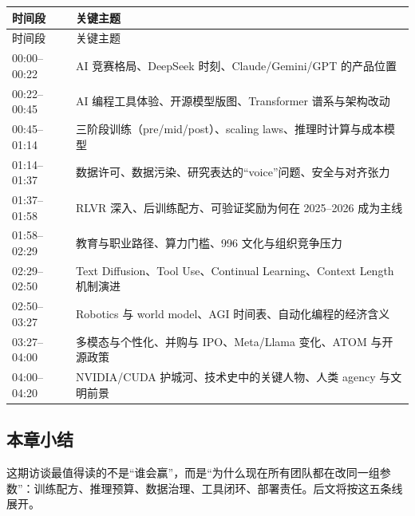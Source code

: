\begin{longtable}{p{}p{}}
\toprule
时间段 & 关键主题 \\
\midrule
\endfirsthead
\toprule
时间段 & 关键主题 \\
\midrule
\endhead
00:00--00:22 & AI 竞赛格局、DeepSeek 时刻、Claude/Gemini/GPT 的产品位置 \\
00:22--00:45 & AI 编程工具体验、开源模型版图、Transformer 谱系与架构改动 \\
00:45--01:14 & 三阶段训练（pre/mid/post）、scaling laws、推理时计算与成本模型 \\
01:14--01:37 & 数据许可、数据污染、研究表达的“voice”问题、安全与对齐张力 \\
01:37--01:58 & RLVR 深入、后训练配方、可验证奖励为何在 2025--2026 成为主线 \\
01:58--02:29 & 教育与职业路径、算力门槛、996 文化与组织竞争压力 \\
02:29--02:50 & Text Diffusion、Tool Use、Continual Learning、Context Length 机制演进 \\
02:50--03:27 & Robotics 与 world model、AGI 时间表、自动化编程的经济含义 \\
03:27--04:00 & 多模态与个性化、并购与 IPO、Meta/Llama 变化、ATOM 与开源政策 \\
04:00--04:20 & NVIDIA/CUDA 护城河、技术史中的关键人物、人类 agency 与文明前景 \\
\bottomrule
\end{longtable}

\subsection{本章小结}

这期访谈最值得读的不是“谁会赢”，而是“为什么现在所有团队都在改同一组参数”：训练配方、推理预算、数据治理、工具闭环、部署责任。后文将按这五条线展开。

